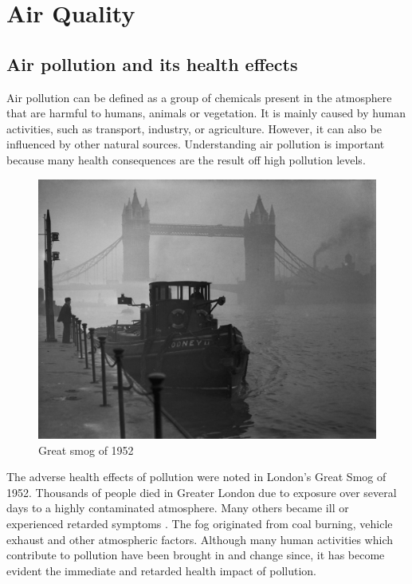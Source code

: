 \section{Air Quality}
\subsection{Air pollution and its health effects}
Air pollution can be defined as a group of chemicals present in the atmosphere that are harmful to humans, animals or vegetation. It is mainly caused by human activities, such as transport, industry, or agriculture. However, it can also be influenced by other natural sources. Understanding air pollution is important because many health consequences are the result off high pollution levels. 
\begin{figure}[h]
  \centering
  \includegraphics[scale=.8]{images/great_smog.jpg}
  \caption[Great smog of 1952]{Great smog of 1952 \cite{ElliotWagland2013}}
  \label{fig:interaction_design}
\end{figure}

The adverse health effects of pollution were noted in London's Great Smog of 1952. Thousands of people died in Greater London due to exposure over several days to a highly contaminated atmosphere. Many others became ill or experienced retarded symptoms \cite{Bell2008}. The fog originated from coal burning, vehicle exhaust and other atmospheric factors. Although many human activities which contribute to pollution have been brought in and change since, it has become evident the immediate and retarded health impact of pollution.

